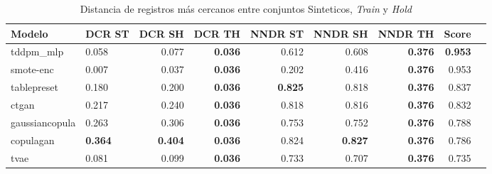 \begin{table}[H]
\centering
\caption{Distancia de registros más cercanos entre conjuntos Sinteticos, \emph{Train} y \emph{Hold}}
\label{table-dcr-king county-a-1}
\begin{tabular}{|l|l|r|r|r|r|r|r|r|}
\hline
\rowcolor[gray]{0.8}
Modelo & DCR ST & DCR SH & DCR TH & NNDR ST & NNDR SH & NNDR TH & \textbf{Score} \\
\hline tddpm\_mlp & 0.058 & 0.077 & \bfseries 0.036 & 0.612 & 0.608 & \bfseries 0.376 & \bfseries 0.953 \\
\hline smote-enc & \cellcolor[rgb]{0.9, 0.54, 0.52} 0.007 & \cellcolor[rgb]{0.9, 0.54, 0.52} 0.037 & \bfseries 0.036 & 0.202 & 0.416 & \bfseries 0.376 & 0.953 \\
\hline tablepreset & 0.180 & 0.200 & \bfseries 0.036 & \bfseries 0.825 & 0.818 & \bfseries 0.376 & 0.837 \\
\hline ctgan & 0.217 & 0.240 & \bfseries 0.036 & 0.818 & 0.816 & \bfseries 0.376 & 0.832 \\
\hline gaussiancopula & 0.263 & 0.306 & \bfseries 0.036 & 0.753 & 0.752 & \bfseries 0.376 & 0.788 \\
\hline copulagan & \bfseries 0.364 & \bfseries 0.404 & \bfseries 0.036 & 0.824 & \bfseries 0.827 & \bfseries 0.376 & 0.786 \\
\hline tvae & 0.081 & 0.099 & \bfseries 0.036 & 0.733 & 0.707 & \bfseries 0.376 & 0.735 \\
\hline
\end{tabular}
\end{table}
